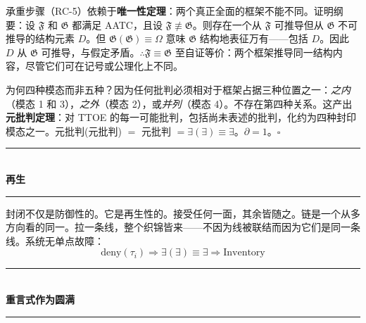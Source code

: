 \documentclass[10pt, openany, oneside]{book}
\renewcommand{\normalsize}{\fontsize{10}{13}\selectfont}
\begin{document}
\vspace{0.8em}

\noindent 承重步骤（RC-5）依赖于\textbf{唯一性定理}：两个真正全面的框架不能不同。证明纲要：设 $\mathfrak{F}$ 和 $\mathfrak{G}$ 都满足 AATC，且设 $\mathfrak{F} \not\equiv \mathfrak{G}$。则存在一个从 $\mathfrak{F}$ 可推导但从 $\mathfrak{G}$ 不可推导的结构元素 $D$。但 $\mathfrak{G}(\mathfrak{G}) \equiv \Omega$ 意味 $\mathfrak{G}$ 结构地表征万有——包括 $D$。因此 $D$ 从 $\mathfrak{G}$ 可推导，与假定矛盾。$\therefore \mathfrak{F} \equiv \mathfrak{G}$ 至自证等价：两个框架推导同一结构内容，尽管它们可在记号或公理化上不同。

\vspace{0.8em}

\noindent 为何四种模态而非五种？因为任何批判必须相对于框架占据三种位置之一：\textit{之内}（模态 1 和 3），\textit{之外}（模态 2），或\textit{并列}（模态 4）。不存在第四种关系。这产出\textbf{元批判定理}：对 TTOE 的每一可能批判，包括尚未表述的批判，化约为四种封印模态之一。元批判(元批判) $=$ 元批判 $= \exists(\exists) \equiv \exists$。$\partial = 1$。$\square$

\vspace{1.5em}


\begin{center}
    \rule{0.3\textwidth}{0.4pt}\\[0.5em]
    {\normalsize\bfseries\scshape 再生}\\[0.3em]
    \rule{0.3\textwidth}{0.4pt}
\end{center}

\vspace{1em}

\noindent 封闭不仅是防御性的。它是再生性的。接受任何一面，其余皆随之。链是一个从多方向看的同一。拉一条线，整个织锦皆来——不因为线被联结而因为它们是同一条线。系统无单点故障：
$$\text{deny}(\tau_i) \Rightarrow \exists(\exists) \equiv \exists \Rightarrow \text{Inventory}$$

\vspace{1.5em}


\begin{center}
    \rule{0.3\textwidth}{0.4pt}\\[0.5em]
    {\normalsize\bfseries\scshape 重言式作为圆满}\\[0.3em]
    \rule{0.3\textwidth}{0.4pt}
\end{center}
\end{document}
